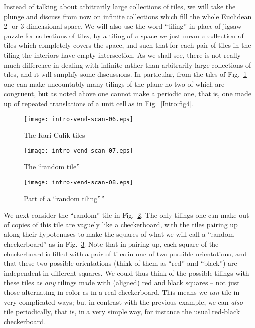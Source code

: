 \documentclass[reqno]{stml-l}
\theoremstyle{plain}
\theoremstyle{definition}
\numberwithin{equation}{chapter}
\begin{document}
Instead of talking about arbitrarily large collections of
tiles, we will take the plunge and discuss from now on
infinite collections which fill the whole Euclidean 2- or
3-dimensional space. We will also use the word
``tiling'' in place of jigsaw puzzle
for collections of tiles; by a tiling of a space we just
mean a collection of tiles which completely covers the
space, and such that for each pair of tiles in the tiling
the interiors have empty intersection. As we shall see,
there is not really much difference in dealing with
infinite rather than arbitrarily large collections of
tiles, and it will simplify some discussions. In
particular, from the tiles of Fig.~\ref{Intro:fig6} one can
make uncountably many tilings of the plane no two of which
are congruent, but as noted above one cannot make a
periodic one, that is, one made up of repeated translations
of a unit cell as in Fig.~\ref{Intro:fig4}.

\begin{figure}[h]
\texttt{[image: intro-vend-scan-06.eps]}
\caption{The Kari-Culik tiles}
\label{Intro:fig6}
\end{figure}

\begin{figure}[h]
\texttt{[image: intro-vend-scan-07.eps]}
\caption{The ``random tile''}
\label{Intro:fig7}
\end{figure}

\begin{figure}[h]
\texttt{[image: intro-vend-scan-08.eps]}
\caption{Part of a ``random tiling''''}
\label{Intro:fig}
\end{figure}

We next consider the ``random'' tile in
Fig.~\ref{Intro:fig7}. The only tilings one can make out of
copies of this tile are vaguely like a checkerboard, with
the tiles pairing up along their hypotenuses to make the
squares of what we will call a ``random checkerboard'' as
in Fig.~\ref{Intro:fig}. Note that in pairing up, each
square of the checkerboard is filled with a pair of tiles
in one of two possible orientations, and that these two
possible orientations (think of them as ``red'' and
``black'') are independent in different squares. We could
thus think of the possible tilings with these tiles as
\emph{any} tilings made with (aligned) red and black
squares -- not just those alternating in color as in a real
checkerboard. This means we \emph{can} tile in very
complicated ways; but in contrast with the previous
example, we can \emph{also} tile periodically, that is, in
a very simple way, for instance the usual red-black
checkerboard.
\end{document}
